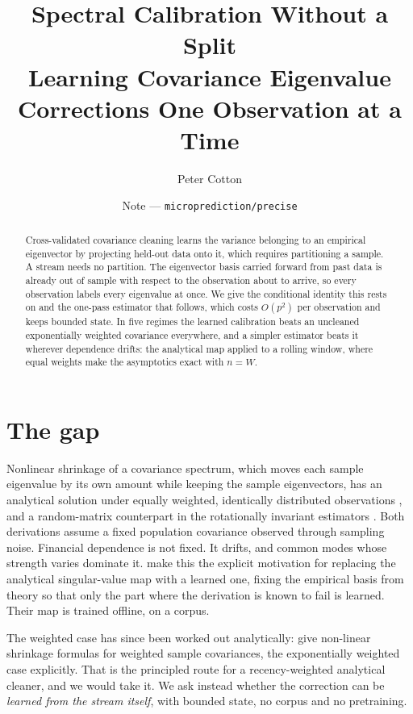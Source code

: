 \documentclass[11pt]{article}
\title{\vspace{-2em}Spectral Calibration Without a Split\\[0.3em]
       \large Learning Covariance Eigenvalue Corrections One Observation at a Time}
\author{Peter Cotton}
\date{Note --- \texttt{microprediction/precise}}
\begin{document}
\maketitle

\begin{abstract}
\noindent
Cross-validated covariance cleaning learns the variance belonging to an empirical eigenvector by
projecting held-out data onto it, which requires partitioning a sample. A stream needs no partition.
The eigenvector basis carried forward from past data is already out of sample with respect to the
observation about to arrive, so every observation labels every eigenvalue at once. We give the
conditional identity this rests on and the one-pass estimator that follows, which costs $O(p^2)$ per
observation and keeps bounded state. In five regimes the learned calibration beats an uncleaned
exponentially weighted covariance everywhere, and a simpler estimator beats it wherever dependence
drifts: the analytical map applied to a rolling window, where equal weights make the asymptotics
exact with $n = W$.
\end{abstract}

\section{The gap}

Nonlinear shrinkage of a covariance spectrum, which moves each sample eigenvalue by its own amount
while keeping the sample eigenvectors, has an analytical solution under equally weighted, identically
distributed observations \citep{ledoitpeche2011,ledoitwolf2020analytical}, and a random-matrix
counterpart in the rotationally invariant estimators \citep{bun2017cleaning}. Both derivations assume
a fixed population covariance observed through sampling noise. Financial dependence is not fixed. It
drifts, and common modes whose strength varies dominate it. \citet{manolakis2026} make this
the explicit motivation for replacing the analytical singular-value map with a learned one, fixing
the empirical basis from theory so that only the part where the derivation is known to fail is
learned. Their map is trained offline, on a corpus.

The weighted case has since been worked out analytically: \citet{oriol2024weighted} give non-linear
shrinkage formulas for weighted sample covariances, the exponentially weighted case explicitly. That
is the principled route for a recency-weighted analytical cleaner, and we would take it. We ask
instead whether the correction can be \emph{learned from the stream itself}, with bounded state, no
corpus and no pretraining.
\end{document}
